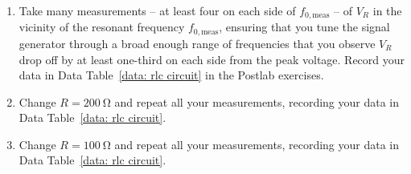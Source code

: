 \documentclass[addpoints]{physlabs}
\begin{document}
\begin{labsection}
\begin{experiment}
\begin{enumerate}
    \item Take many measurements -- at least four on each side of $f_{0,\text{meas}}$ -- of $V_R$ in the vicinity of the resonant frequency $f_{0,\text{meas}}$, ensuring that you tune the signal generator through a broad enough range of frequencies that you observe $V_R$ drop off by at least one-third on each side from the peak voltage. Record your data in Data Table~\ref{data: rlc circuit} in the Postlab exercises.
    
    \item Change $R=\qty{200}{\ohm}$ and repeat all your measurements, recording your data in Data Table~\ref{data: rlc circuit}.
    
    \item Change $R=\qty{100}{\ohm}$ and repeat all your measurements, recording your data in Data Table~\ref{data: rlc circuit}.
    
\end{enumerate}

\end{experiment}

\end{labsection}
\end{document}
